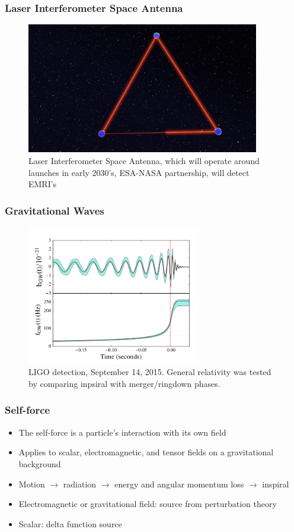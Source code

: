 \documentclass{beamer}
\begin{document}
\begin{frame}
  \frametitle{Laser Interferometer Space Antenna}
  \begin{figure}
    \includegraphics[width=4.0in]{eLISA}
    \caption{Laser Interferometer Space Antenna, which will operate around launches in early 2030's, ESA-NASA partnership, will detect EMRI's}
  \end{figure}
\end{frame}


\begin{frame}
  \frametitle{Gravitational Waves}
  \begin{figure}
    \includegraphics[width=3.0in]{LIGOGRtest.png}
    \caption{LIGO detection, September 14, 2015. General relativity was tested by comparing inpsiral with merger/ringdown phases.}
  \end{figure}
\end{frame}

\begin{frame}
  \frametitle{Self-force}
  \begin{itemize}
  \item The self-force is a particle's interaction with its own field
  \item Applies to scalar, electromagnetic, and tensor fields on a gravitational background
  \item Motion $\rightarrow$ radiation $\rightarrow$ energy and angular momentum loss $\rightarrow$ inspiral
  \item Electromagnetic or gravitational field: source from perturbation theory
  \item Scalar: delta function source
  \end{itemize}
\end{frame}
\end{document}
